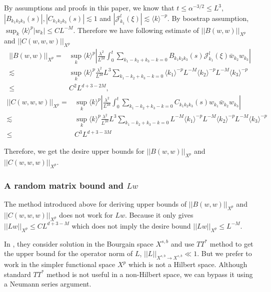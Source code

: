 By assumptions and proofs in this paper, we know that $t\le \alpha^{-3/2}\le L^3$,  $|B_{k_1k_2k_3}(s)|, |C_{k_1k_2k_3}(s)|\lesssim 1$ and $|\mathcal{J}^{l}_{k_1}(\xi)|\lesssim \langle k\rangle^{-p}$. By boostrap assumption, $\sup_{k} \langle k\rangle^{p} |w_k|\le CL^{-M}$. Therefore we have following estimate of $||B(w,w)||_{X^p}$ and $||C(w,w,w)||_{X^p}$
\begin{equation}
\begin{split}
    ||B(w,w)||_{X^p}=&\sup_{k} \langle k\rangle^{p} \left|\frac{\lambda^2}{L^{2d}} \int^{t}_0\sum_{k_1-k_2+k_3-k=0} B_{k_1k_2k_3}(s)  \mathcal{J}^{l}_{k_1}(\xi)\bar{w}_{k_2}w_{k_3}\right|    
    \\
    \lesssim& \sup_{k} \langle k\rangle^{p} \frac{\lambda^2}{L^{2d}} L^3 \sum_{k_1-k_2+k_3-k=0} \langle k_1\rangle^{-p} L^{-M}\langle k_2\rangle^{-p} L^{-M}\langle k_3\rangle^{-p}
    \\
    \le& C^2 L^{d+3-2M},
\end{split}
\end{equation}
\begin{equation}
\begin{split}
    ||C(w,w,w)||_{X^p}=&\sup_{k} \langle k\rangle^{p} \left|\frac{\lambda^2}{L^{2d}} \int^{t}_0\sum_{k_1-k_2+k_3-k=0} C_{k_1k_2k_3}(s)  w_{k_1}\bar{w}_{k_2}w_{k_3}\right|
    \\
    \lesssim& \sup_{k} \langle k\rangle^{p} \frac{\lambda^2}{L^{2d}} L^3 \sum_{k_1-k_2+k_3-k=0} L^{-M}\langle k_1\rangle^{-p} L^{-M}\langle k_2\rangle^{-p} L^{-M}\langle k_3\rangle^{-p}
    \\
    \le& C^3 L^{d+3-3M}
\end{split}
\end{equation}

Therefore, we get the desire upper bounds for $||B(w,w)||_{X^p}$ and $||C(w,w,w)||_{X^p}$.

\subsubsection{A random matrix bound and $Lw$}\label{sec.randmatintro} The method introduced above for deriving upper bounds of $||B(w,w)||_{X^p}$ and $||C(w,w,w)||_{X^p}$ does not work for $Lw$. Because it only gives $||Lw||_{X^p}\le CL^{d+3-M}$ which does not imply the desire bound $||Lw||_{X^p}\le L^{-M}$.

In \cite{DH}, they consider solution in the Bourgain space $X^{s,b}$ and use $TT^*$ method to get the upper bound for the operator norm of $L$, $||L||_{X^{s,b}\rightarrow X^{s,b}}\ll 1$. But we prefer to work in the simpler functional space $X^p$ which is not a Hilbert space. Although standard $TT^*$ method is not useful in a non-Hilbert space, we can bypass it using a Neumann series argument.

